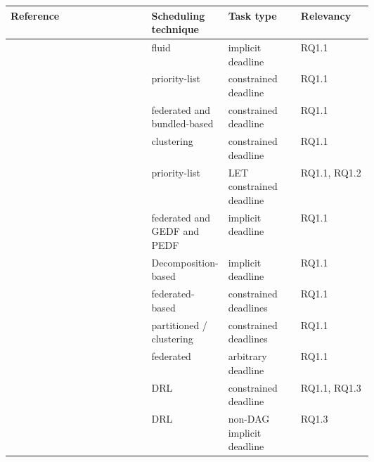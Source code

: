 \begin{table}
    \centering
    \begin{tabular}[]{|l|p{0.20\linewidth}|p{0.20\linewidth}|p{0.20\linewidth}|}
        \hline
        \textbf{Reference} & \textbf{Scheduling technique} & \textbf{Task type} & \textbf{Relevancy}\\
        \hline
        \cite{guan2021DAGfluid} & fluid & implicit deadline & RQ1.1\\%
        \hline
        \cite{He2019DagIntra} & priority-list & constrained deadline & RQ1.1\\%
        \hline
        \cite{Kobayashi2023FedBundledDagsched} & federated and bundled-based & constrained deadline & RQ1.1\\%
        \hline
        \cite{Xiao2019}  & clustering & constrained deadline & RQ1.1\\%
        \hline
        \cite{Igarashi2020HeuristicContentionFree}  & priority-list & LET constrained deadline & RQ1.1, RQ1.2\\%
        \hline
        \cite{jiangUtilTensityBound}  & federated and GEDF and PEDF & implicit deadline & RQ1.1\\%
        \hline
        \cite{JiangDecompoSchedParallelTask} & Decomposition-based & implicit deadline & RQ1.1\\%
        \hline
        \cite{He2023DegreeOfParallelism} & federated-based & constrained deadlines & RQ1.1\\%
        \hline
        \cite{Shi2024DagExecGroups}  & partitioned / clustering & constrained deadlines & RQ1.1\\%
        \hline
        \cite{Guan2023FederatedNew}  & federated & arbitrary deadline & RQ1.1\\%
        \hline
        \cite{Zhao2024GATDRLmodel} & DRL & constrained deadline & RQ1.1, RQ1.3\\%
        \hline
        \cite{Xu2023DRLtaskSched} & DRL & non-DAG implicit deadline & RQ1.3\\%

\end{tabular}
\end{table}
